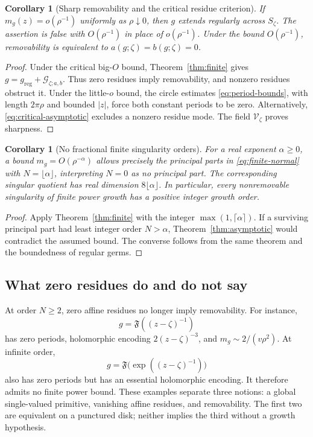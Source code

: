 \documentclass[11pt,a4paper]{article}
\numberwithin{equation}{section}
\newtheorem{corollary}[theorem]{Corollary}
\theoremstyle{definition}
\theoremstyle{remark}
\newcommand{\Fu}{\mathfrak F}
\newcommand{\G}{\mathcal G}
\newcommand{\Vker}{\mathcal V}
\begin{document}
\begin{corollary}[Sharp removability and the critical residue criterion]
\label{cor:sharp}
If $m_g(z)=o(\rho^{-1})$ uniformly as $\rho\downarrow0$, then $g$
extends regularly across $S_\zeta$. The assertion is false with
$O(\rho^{-1})$ in place of $o(\rho^{-1})$.
Under the bound $O(\rho^{-1})$, removability is equivalent to
$a(g;\zeta)=b(g;\zeta)=0$.
\end{corollary}
\begin{proof}
Under the critical big-$O$ bound, Theorem~\ref{thm:finite} gives
$g=g_{\mathrm{reg}}+\G_{\zeta;a,b}$. Thus zero residues imply
removability, and nonzero residues obstruct it.
Under the little-$o$ bound, the circle estimates
\eqref{eq:period-bounds}, with length $2\pi\rho$ and bounded $|z|$,
force both constant periods to be zero. Alternatively,
\eqref{eq:critical-asymptotic} excludes a nonzero residue mode.
The field $\Vker_\zeta$ proves sharpness.
\end{proof}

\begin{corollary}[No fractional finite singularity orders]
\label{cor:fractional}
For a real exponent $\alpha\ge0$, a bound $m_g=O(\rho^{-\alpha})$
allows precisely the principal parts in \eqref{eq:finite-normal} with
$N=\lfloor\alpha\rfloor$, interpreting $N=0$ as no principal part.
The corresponding singular quotient has real dimension
$8\lfloor\alpha\rfloor$. In particular, every nonremovable singularity
of finite power growth has a positive integer growth order.
\end{corollary}
\begin{proof}
Apply Theorem~\ref{thm:finite} with the integer
$\max(1,\lceil\alpha\rceil)$. If a surviving principal part had least
integer order $N>\alpha$, Theorem~\ref{thm:asymptotic} would contradict
the assumed bound. The converse follows from the same theorem and the
boundedness of regular germs.
\end{proof}

\subsection{What zero residues do and do not say}
At order $N\ge2$, zero affine residues no longer imply removability.
For instance,
\[
 g=\Fu((z-\zeta)^{-1})
\]
has zero periods, holomorphic encoding $2(z-\zeta)^{-3}$, and
$m_g\sim2/(v\rho^2)$. At infinite order,
\[
 g=\Fu\bigl(\exp((z-\zeta)^{-1})\bigr)
\]
also has zero periods but has an essential holomorphic encoding.
It therefore admits no finite power bound. These examples separate
three notions: a global single-valued primitive, vanishing affine
residues, and removability. The first two are equivalent on a punctured
disk; neither implies the third without a growth hypothesis.
\end{document}
